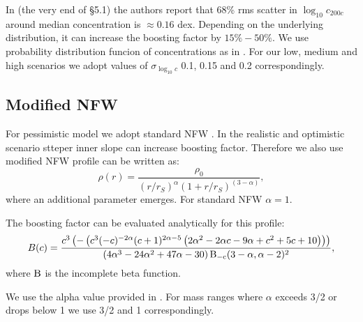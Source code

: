 In \cite{2014arXiv1407.4730D} (the very end of \S5.1) the authors report that 68\% rms scatter in $\log_{10}c_{200c}$ around median concentration is $\approx 0.16$ dex. Depending on the underlying distribution, it can increase the boosting factor by $15\%-50\%$. We use probability distribution funcion of concentrations as in \cite{2014arXiv1412.4308M}. For our low, medium and high scenarios we adopt values of $\sigma_{\log_{10} c}$ 0.1, 0.15 and 0.2 correspondingly.

\subsection{Modified NFW}

For pessimistic model we adopt standard NFW \cite{1997ApJ...490..493N}. In the realistic and optimistic scenario stteper inner slope can increase boosting factor. Therefore we also use modified NFW profile can be written as:
\begin{equation}
\rho(r) = \dfrac{\rho_0}{(r/r_S)^\alpha(1+r/r_S)^{(3-\alpha)}},
\end{equation}
where an additional parameter \alpha emerges. For standard NFW $\alpha=1$.

The boosting factor can be evaluated analytically for this profile:
\begin{equation}
B(c) = \frac{c^3 \left(-\left(c^3 (-c)^{-2 \alpha} (c+1)^{2 \alpha-5} \left(2 \alpha^2-2 \alpha c-9 \alpha+c^2+5 c+10\right)\right)\right)}{\left(4 \alpha^3-24 \alpha^2+47 \alpha-30\right) \rm{B}_{-c}(3-\alpha,\alpha-2){}^2},
\end{equation}
where $\rm{B}$ is the incomplete beta function.

We use the alpha value provided in \cite{Ishiyama_2014}. For mass ranges where $\alpha$ exceeds 3/2 or drops below 1 we use 3/2 and 1 correspondingly.